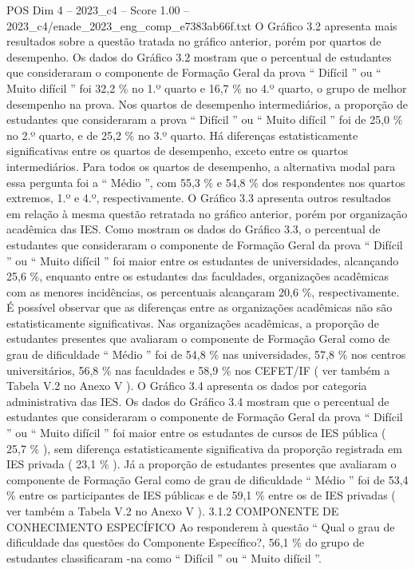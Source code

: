 \begin{textsample}{POS Dim 4 – 2023\_c4 – Score 1.00 – 2023\_c4/enade\_2023\_eng\_comp\_e7383ab66f.txt}
O Gráfico 3.2 apresenta mais resultados sobre a questão tratada no gráfico anterior, porém por quartos de desempenho.
Os dados do Gráfico 3.2 mostram que o percentual de estudantes que consideraram o componente de Formação Geral da prova “ Difícil ” ou “ Muito difícil ” foi 32,2 \% no 1.º quarto e 16,7 \% no 4.º quarto, o grupo de melhor desempenho na prova.
Nos quartos de desempenho intermediários, a proporção de estudantes que consideraram a prova “ Difícil ” ou “ Muito difícil ” foi de 25,0 \% no 2.º quarto, e de 25,2 \% no 3.º quarto.
Há diferenças estatisticamente significativas entre os quartos de desempenho, exceto entre os quartos intermediários.
Para todos os quartos de desempenho, a alternativa modal para essa pergunta foi a “ Médio ”, com 55,3 \% e 54,8 \% dos respondentes nos quartos extremos, 1.º e 4.º, respectivamente.
O Gráfico 3.3 apresenta outros resultados em relação à mesma questão retratada no gráfico anterior, porém por organização acadêmica das IES.
Como mostram os dados do Gráfico 3.3, o percentual de estudantes que consideraram o componente de Formação Geral da prova “ Difícil ” ou “ Muito difícil ” foi maior entre os estudantes de universidades, alcançando 25,6 \%, enquanto entre os estudantes das faculdades, organizações acadêmicas com as menores incidências, os percentuais alcançaram 20,6 \%, respectivamente.
É possível observar que as diferenças entre as organizações acadêmicas não são estatisticamente significativas.
Nas organizações acadêmicas, a proporção de estudantes presentes que avaliaram o componente de Formação Geral como de grau de dificuldade “ Médio ” foi de 54,8 \% nas universidades, 57,8 \% nos centros universitários, 56,8 \% nas faculdades e 58,9 \% nos CEFET/IF ( ver também a Tabela V.2 no Anexo V ).
O Gráfico 3.4 apresenta os dados por categoria administrativa das IES.
Os dados do Gráfico 3.4 mostram que o percentual de estudantes que consideraram o componente de Formação Geral da prova “ Difícil ” ou “ Muito difícil ” foi maior entre os estudantes de cursos de IES pública ( 25,7 \% ), sem diferença estatisticamente significativa da proporção registrada em IES privada ( 23,1 \% ).
Já a proporção de estudantes presentes que avaliaram o componente de Formação Geral como de grau de dificuldade “ Médio ” foi de 53,4 \% entre os participantes de IES públicas e de 59,1 \% entre os de IES privadas ( ver também a Tabela V.2 no Anexo V ). 3.1.2 COMPONENTE DE CONHECIMENTO ESPECÍFICO Ao responderem à questão “ Qual o grau de dificuldade das questões do Componente Específico?, 56,1 \% do grupo de estudantes classificaram -na como “ Difícil ” ou “ Muito difícil ”.

\end{textsample}
